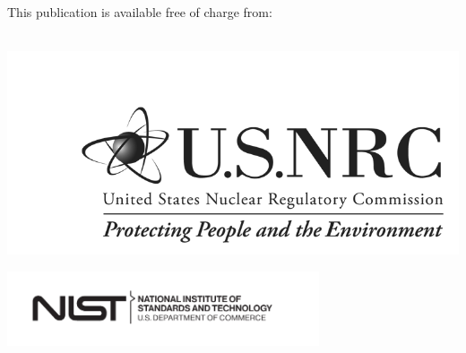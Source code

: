 	\begin{titlepage}
		\begin{flushright}
\LARGE{}\\
\LARGE{\sffamily{\textbf{\pubnumber}}}\\
\vfill
\Huge{\sffamily{\textbf{\pubtitle}}}\\
\Large{\sffamily{\textit{\pubsubtitle}}}\\
\vfill
\large \authorone\\
\large \authortwo\\
\vfill
\normalsize This publication is available free of charge from:\\
\DOI\\
\vfill

\includegraphics[width=0.5\linewidth]{../FIGURES/NRC_logo} %

\vspace{0.5in}

\includegraphics[trim=0 0 0.7in 0,clip,width=3.62in]{../FIGURES/NIST-logo.pdf}\\

\end{flushright}
\end{titlepage}
